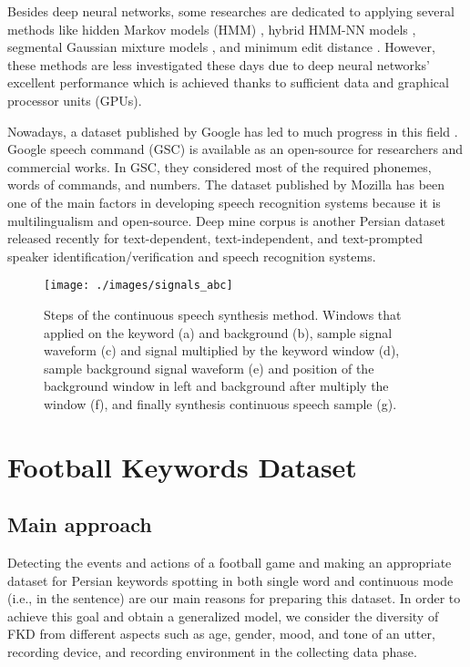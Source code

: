 \documentclass{article}
\begin{document}
Besides deep neural networks, some researches are dedicated to applying several methods like hidden Markov models (HMM) \cite{hmm}, hybrid HMM-NN models \cite{hyb}, segmental Gaussian mixture models \cite{msr}, and minimum edit distance \cite{med}. However, these methods are less investigated these days due to deep neural networks' excellent performance which is achieved thanks to sufficient data and graphical processor units (GPUs).

Nowadays, a dataset published by Google has led to much progress in this field \cite{scd}. Google speech command (GSC) is available as an open-source for researchers and commercial works. In GSC, they considered most of the required phonemes, words of commands, and numbers. The dataset published by Mozilla \cite{mozila} has been one of the main factors in developing speech recognition systems because it is multilingualism and open-source. Deep mine corpus \cite{deepmine} is another Persian dataset released recently for text-dependent, text-independent, and text-prompted speaker identification/verification and speech recognition systems.
\begin{figure*}[t]
  \centering
  \texttt{[image: ./images/signals\_abc]}
  \caption{Steps of the continuous speech synthesis method. Windows that applied on the keyword (a) and background (b), sample signal waveform (c) and signal multiplied by the keyword window (d), sample background signal waveform (e) and position of the background window in left and background after multiply the window (f), and finally synthesis continuous speech sample (g).}
  \label{fig:cssm}
\end{figure*}
\section{Football Keywords Dataset }
\subsection{Main approach}
Detecting the events and actions of a football game and making an appropriate dataset for Persian keywords spotting in both single word and continuous mode (i.e., in the sentence) are our main reasons for preparing this dataset. In order to achieve this goal and obtain a generalized model, we consider the diversity of FKD from different aspects such as age, gender, mood, and tone of an utter, recording device, and recording environment in the collecting data phase.
\end{document}
